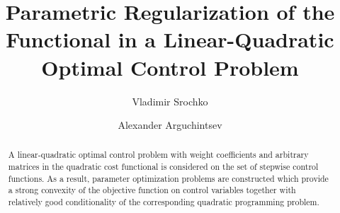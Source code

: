 \begin{englishtitle} %
\title{Parametric Regularization of the Functional in a Linear-Quadratic Optimal Control Problem}
\author{Vladimir Srochko
  \and
  Alexander Arguchintsev
}


\maketitle

\begin{abstract}
A linear-quadratic optimal control problem with weight coefficients and arbitrary matrices in the quadratic cost functional is considered on the set of stepwise control functions. As a result, parameter optimization problems are constructed which provide a strong convexity of the objective function on control variables together with relatively good conditionality of the corresponding quadratic programming problem.

\end{abstract}
\end{englishtitle}



\iffalse
\documentclass[12pt]{llncs} 
\usepackage{iftex}

\ifPDFTeX
\usepackage[T2A]{fontenc}
\usepackage[utf8]{inputenc} %
\usepackage[english,russian]{babel}
\fi




